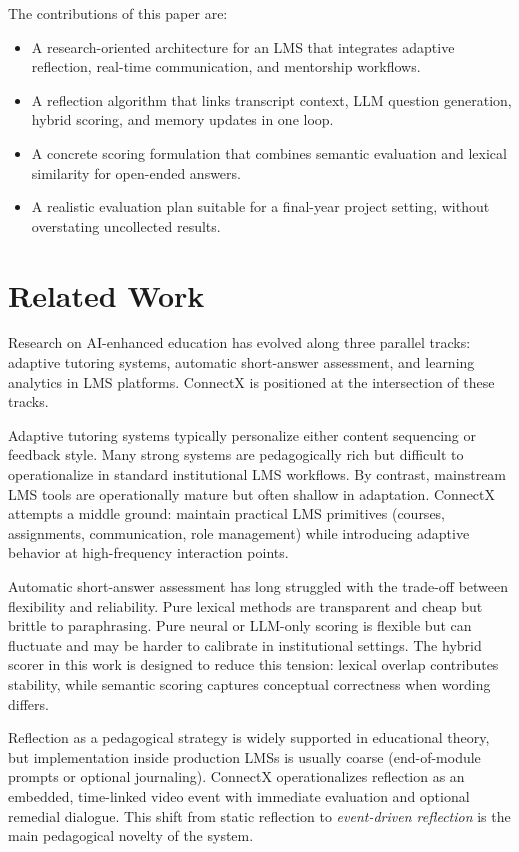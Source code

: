 \documentclass[conference]{IEEEtran}
\begin{document}
The contributions of this paper are:
\begin{itemize}
\item A research-oriented architecture for an LMS that integrates adaptive reflection, real-time communication, and mentorship workflows.
\item A reflection algorithm that links transcript context, LLM question generation, hybrid scoring, and memory updates in one loop.
\item A concrete scoring formulation that combines semantic evaluation and lexical similarity for open-ended answers.
\item A realistic evaluation plan suitable for a final-year project setting, without overstating uncollected results.
\end{itemize}

\section{Related Work}
Research on AI-enhanced education has evolved along three parallel tracks: adaptive tutoring systems, automatic short-answer assessment, and learning analytics in LMS platforms. ConnectX is positioned at the intersection of these tracks.

Adaptive tutoring systems typically personalize either content sequencing or feedback style. Many strong systems are pedagogically rich but difficult to operationalize in standard institutional LMS workflows. By contrast, mainstream LMS tools are operationally mature but often shallow in adaptation. ConnectX attempts a middle ground: maintain practical LMS primitives (courses, assignments, communication, role management) while introducing adaptive behavior at high-frequency interaction points.

Automatic short-answer assessment has long struggled with the trade-off between flexibility and reliability. Pure lexical methods are transparent and cheap but brittle to paraphrasing. Pure neural or LLM-only scoring is flexible but can fluctuate and may be harder to calibrate in institutional settings. The hybrid scorer in this work is designed to reduce this tension: lexical overlap contributes stability, while semantic scoring captures conceptual correctness when wording differs.

Reflection as a pedagogical strategy is widely supported in educational theory, but implementation inside production LMSs is usually coarse (end-of-module prompts or optional journaling). ConnectX operationalizes reflection as an embedded, time-linked video event with immediate evaluation and optional remedial dialogue. This shift from static reflection to \textit{event-driven reflection} is the main pedagogical novelty of the system.
\end{document}
